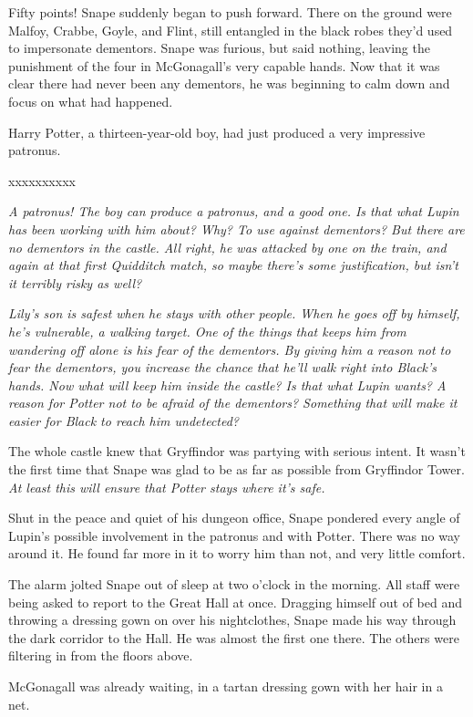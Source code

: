 \documentclass[a4paper,11pt]{article}
\begin{document}
Fifty points! Snape suddenly began to push forward. There on the ground were Malfoy, Crabbe, Goyle, and Flint, still entangled in the black robes they'd used to impersonate dementors. Snape was furious, but said nothing, leaving the punishment of the four in McGonagall's very capable hands. Now that it was clear there had never been any dementors, he was beginning to calm down and focus on what had happened.

Harry Potter, a thirteen-year-old boy, had just produced a very impressive patronus.

xxxxxxxxxx

\emph{A patronus! The boy can produce a patronus, and a good one. Is that what Lupin has been working with him about? Why? To use against dementors? But there are no dementors in the castle. All right, he was attacked by one on the train, and again at that first Quidditch match, so maybe there's some justification, but isn't it terribly risky as well?}

\emph{Lily's son is safest when he stays with other people. When he goes off by himself, he's vulnerable, a walking target. One of the things that keeps him from wandering off alone is his fear of the dementors. By giving him a reason not to fear the dementors, you increase the chance that he'll walk right into Black's hands. Now what will keep him inside the castle? Is that what Lupin wants? A reason for Potter not to be afraid of the dementors? Something that will make it easier for Black to reach him undetected?}

The whole castle knew that Gryffindor was partying with serious intent. It wasn't the first time that Snape was glad to be as far as possible from Gryffindor Tower. \emph{At least this will ensure that Potter stays where it's safe.}

Shut in the peace and quiet of his dungeon office, Snape pondered every angle of Lupin's possible involvement in the patronus and with Potter. There was no way around it. He found far more in it to worry him than not, and very little comfort.

The alarm jolted Snape out of sleep at two o'clock in the morning. All staff were being asked to report to the Great Hall at once. Dragging himself out of bed and throwing a dressing gown on over his nightclothes, Snape made his way through the dark corridor to the Hall. He was almost the first one there. The others were filtering in from the floors above.

McGonagall was already waiting, in a tartan dressing gown with her hair in a net.
\end{document}
